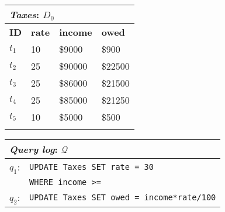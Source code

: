 

\begin{figure*}[t]
    \begin{minipage}[t]{0.28\textwidth}
         \vspace{0pt} 
         \centering
        \begin{tabular}{llll}
            \multicolumn{4}{l}{\emph{Taxes}: $D_0$}\\
            \toprule
            \textbf{ID}  & \textbf{rate}  & \textbf{income}    & \textbf{owed}\\
            \midrule
            $t_1$   & 10    & \$9000    & \$900\\
            $t_2$   & 25    & \$90000   & \$22500\\
            $t_3$   & 25    & \$86000   & \$21500\\
            $t_4$	 & 25	& \$85000	  & \$21250 \\
            $t_5$	 & 10	& \$5000	  & \$500 \\
            \bottomrule
            \\
        \end{tabular}
    \end{minipage}
    \begin{minipage}[t]{0.43\textwidth}
         \vspace{0pt} 
         \centering
        \begin{tabular}{|p{1ex}l|}
            \multicolumn{2}{l}{\emph{Query log}: $\mathcal{Q}$}\\
            \hline
            $q_1$: & \texttt{\small UPDATE Taxes SET rate = 30}\\
                   & \texttt{\small WHERE income >= \color{red}{8570} \color{black}{and income <=} \color{red}{10000}} \\
            
            $q_2$: & \texttt{\small UPDATE Taxes SET owed = income*rate/100}\\
            

\end{tabular}
\end{minipage}
\end{figure*}
